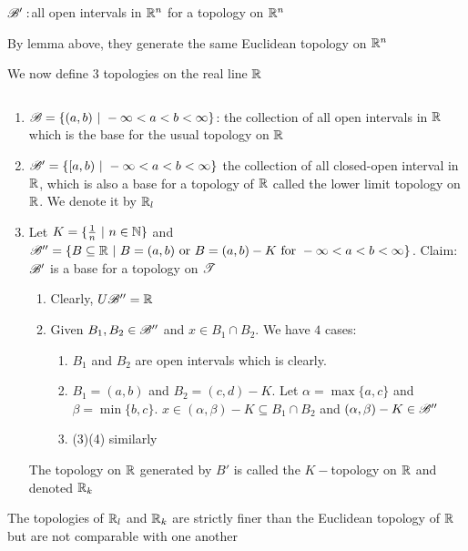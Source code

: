 $\mathscr{B}':$all open intervals in $\mathbb{R}^n$ for a topology on $\mathbb{R}^n$

By lemma above, they generate the same Euclidean topology on $\mathbb{R}^n$

We now define $3$ topologies on the real line $\mathbb{R}$
\begin{defn}$ $
	\begin{enumerate}
		\item $\mathscr{B} = \{(a,b)~|~-\infty < a < b < \infty\}$: the collection of all open intervals in $\mathbb{R}$ which is the base for the usual topology on $\mathbb{R}$
		\item $\mathscr{B}' = \{[a,b)~|~-\infty < a < b < \infty\}$ the collection of all closed-open interval in $\mathbb{R}$, which is also a base for a topology of $\mathbb{R}$ called the lower limit topology on $\mathbb{R}$. We denote it by $\mathbb{R}_l$
		\item Let $K = \{\frac{1}{n}~|~n \in \mathbb{N}\}$ and $\mathscr{B}'' = \{B \subseteq \mathbb{R} ~|~ B = (a,b) \text{ or }B=(a,b) - K \text{ for } -\infty < a < b < \infty\}$. Claim: $\mathscr{B}'$ is a base for a topology on $\mathscr{T}$
			\begin{enumerate}[label = $\star$]
			\item Clearly, $U \mathscr{B}'' = \mathbb{R}$
			\item Given $B_1,B_2 \in \mathscr{B}''$ and $x \in B_1 \cap B_2$. We have $4$ cases:
				\begin{enumerate}
				\item $B_1$ and $B_2$ are open intervals which is clearly.
				\item $B_1 = (a,b)$ and $B_2 = (c,d) - K$. Let $\alpha = \max\{a,c\}$ and $\beta = \min\{b,c\}$. $x \in (\alpha,\beta) - K \subseteq B_1 \cap B_2$ and $(\alpha , \beta) - K \in \mathscr{B}''$
				\item (3)(4) similarly
				\end{enumerate} 
			\end{enumerate} 
			The topology on $\mathbb{R}$ generated by $B'$ is called the $K-$topology on $\mathbb{R}$ and denoted $\mathbb{R}_k$
	\end{enumerate}
\end{defn}

\begin{lmma*}
	The topologies of $\mathbb{R}_l$ and $\mathbb{R}_k$ are strictly finer than the Euclidean topology of $\mathbb{R}$ but are not comparable with one another
\end{lmma*}

